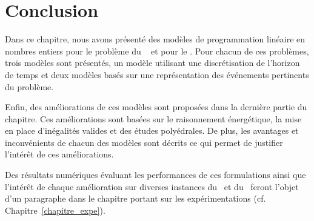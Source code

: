 \section{Conclusion}

Dans ce chapitre, nous avons présenté des modèles de programmation
linéaire en nombres entiers pour le problème du \RCPSP~ et pour le
\CECSP. Pour chacun de ces problèmes, trois modèles sont présentés,
un modèle utilisant une discrétisation de l'horizon de temps et deux
modèles basés sur une représentation des événements pertinents du
problème. 

Enfin, des améliorations de ces modèles sont proposées dans la
dernière partie du chapitre. Ces améliorations sont basées sur le
raisonnement énergétique, la mise en place d'inégalités valides et des
études polyédrales. De plus, les avantages et inconvénients de chacun
des modèles sont décrits ce qui permet de justifier l'intérêt de ces
améliorations. 

Des résultats numériques évaluant les performances de ces formulations
ainsi que l'intérêt de chaque amélioration sur diverses instances du
\CECSP~et du \RCPSP~feront l'objet d'un paragraphe dans le chapitre
portant sur les expérimentations (cf. Chapitre~\ref{chapitre_expe}). 
